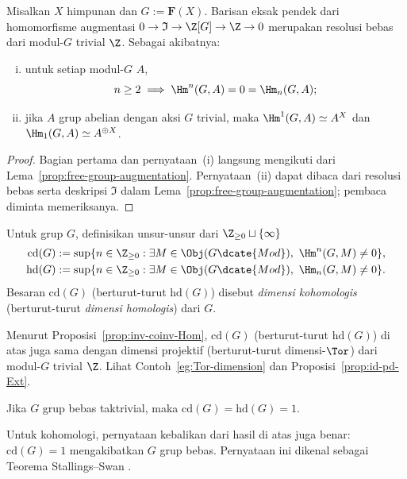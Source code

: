 \begin{proposition}\label{prop:free-group-coh}
	Misalkan $X$ himpunan dan $G:=\mathbf{F}(X)$. Barisan eksak pendek dari
	homomorfisme augmentasi
	$0\to\mathfrak{I}\to\Z[G]\to\Z\to0$ merupakan resolusi bebas dari
	modul-$G$ trivial $\Z$. Sebagai akibatnya:
	\begin{enumerate}[(i)]
		\item untuk setiap modul-$G$ $A$,
		\[ n\geq2\implies\Hm^n(G,A)=0=\Hm_n(G,A); \]
		\item jika $A$ grup abelian dengan aksi $G$ trivial, maka
		$\Hm^1(G,A)\simeq A^X$ dan
		$\Hm_1(G,A)\simeq A^{\oplus X}$.
	\end{enumerate}
\end{proposition}
\begin{proof}
	Bagian pertama dan pernyataan~(i) langsung mengikuti dari
	Lema~\ref{prop:free-group-augmentation}. Pernyataan~(ii) dapat dibaca dari
	resolusi bebas serta deskripsi $\mathfrak{I}$ dalam
	Lema~\ref{prop:free-group-augmentation}; pembaca diminta memeriksanya.
\end{proof}

\begin{definition}\label{def:group-dim}
	Untuk grup $G$, definisikan unsur-unsur dari
	$\Z_{\geq0}\sqcup\{\infty\}$
	\begin{align*}
		\mathrm{cd}(G)&:=\sup\{n\in\Z_{\geq0}:\exists M\in\Obj(G\dcate{Mod}),
		\ \Hm^n(G,M)\neq0\},\\
		\mathrm{hd}(G)&:=\sup\{n\in\Z_{\geq0}:\exists M\in\Obj(G\dcate{Mod}),
		\ \Hm_n(G,M)\neq0\}.
	\end{align*}
	Besaran $\mathrm{cd}(G)$ (berturut-turut $\mathrm{hd}(G)$) disebut
	\emph{dimensi kohomologis} (berturut-turut \emph{dimensi homologis}) dari
	$G$.
\end{definition}

Menurut Proposisi~\ref{prop:inv-coinv-Hom}, $\mathrm{cd}(G)$ (berturut-turut
$\mathrm{hd}(G)$) di atas juga sama dengan dimensi projektif (berturut-turut
dimensi-$\Tor$) dari modul-$G$ trivial $\Z$. Lihat
Contoh~\ref{eg:Tor-dimension} dan Proposisi~\ref{prop:id-pd-Ext}.

\begin{corollary}
	Jika $G$ grup bebas taktrivial, maka
	$\mathrm{cd}(G)=\mathrm{hd}(G)=1$.
\end{corollary}

Untuk kohomologi, pernyataan kebalikan dari hasil di atas juga benar:
$\mathrm{cd}(G)=1$ mengakibatkan $G$ grup bebas. Pernyataan ini dikenal
sebagai Teorema Stallings--Swan \cite{Sw69}.
